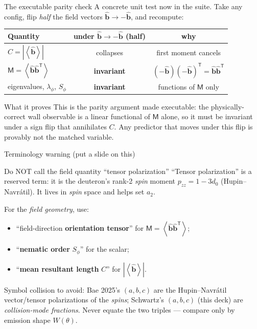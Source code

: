 \documentclass[aspectratio=169]{beamer}
\newcommand{\bb}{\hat{\bm b}}
\newcommand{\T}{\mathsf T}
\newcommand{\avg}[1]{\left\langle #1 \right\rangle}
\newcommand{\M}{\mathsf M}
\newcommand{\Sphi}{S_\phi}
\newcommand{\lamphi}{\lambda_\phi}
\begin{document}
\begin{frame}[t]{The executable parity check}
A concrete unit test now in the suite. Take any config, flip \emph{half} the field vectors $\bb\to-\bb$, and recompute:
\renewcommand{\arraystretch}{1.15}
\begin{center}
\begin{tabular}{lcc}
\toprule
Quantity & under $\bb\to-\bb$ (half) & why \\
\midrule
$C=|\avg{\bb}|$ & \alert{collapses} & first moment cancels \\
$\M=\avg{\bb\bb^\T}$ & \textbf{invariant} & $(-\bb)(-\bb)^\T=\bb\bb^\T$ \\
eigenvalues, $\lamphi$, $\Sphi$ & \textbf{invariant} & functions of $\M$ only \\
\bottomrule
\end{tabular}
\end{center}
\vspace{0.5em}
\begin{block}{What it proves}
This is the parity argument made executable: the physically-correct wall observable is a linear functional of $\M$ alone, so it must be invariant under a sign flip that annihilates $C$. Any predictor that moves under this flip is provably not the matched variable.
\end{block}
\end{frame}

\begin{frame}[t]{Terminology warning (put a slide on this)}
\begin{block}{Do NOT call the field quantity ``tensor polarization''}
``Tensor polarization'' is a reserved term: it is the deuteron's rank-2 \emph{spin} moment $p_{zz}=1-3d_0$ (Hupin--Navr\'atil). It lives in \emph{spin} space and helps set $a_2$.
\end{block}
For the \emph{field geometry}, use:
\begin{itemize}
  \item ``field-direction \textbf{orientation tensor}'' for $\M=\avg{\bb\bb^\T}$;
  \item ``\textbf{nematic order} $\Sphi$'' for the scalar;
  \item ``\textbf{mean resultant length} $C$'' for $|\avg{\bb}|$.
\end{itemize}
\alert{Symbol collision to avoid:} Bae 2025's $(a,b,c)$ are the Hupin--Navr\'atil vector/tensor polarizations of the \emph{spins}; Schwartz's $(a,b,c)$ (this deck) are \emph{collision-mode fractions}. Never equate the two triples --- compare only by emission shape $W(\theta)$.
\end{frame}
\end{document}

